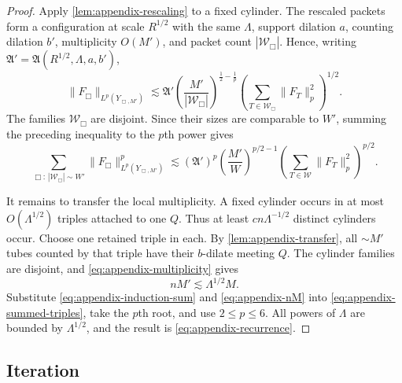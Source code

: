 \documentclass[11pt,letterpaper]{amsart}
\begin{document}
\begin{proof}
Apply \cref{lem:appendix-rescaling} to a fixed cylinder.  The rescaled
packets form a configuration at scale $R^{1/2}$ with the same $\Lambda$,
support dilation $a$, counting dilation $b'$, multiplicity $O(M')$, and
packet count $|\mathcal W_\Box|$.  Hence, writing
$\mathfrak A'=\mathfrak A(R^{1/2},\Lambda,a,b')$,
\[
 \|F_\Box\|_{L^p(Y_{\Box,M'})}
 \lesssim \mathfrak A'
 \left(\frac{M'}{|\mathcal W_\Box|}\right)^{\frac12-\frac1p}
 \left(\sum_{T\in\mathcal W_\Box}\|F_T\|_p^2\right)^{1/2}.
\]
The families $\mathcal W_\Box$ are disjoint.  Since their sizes are
comparable to $W'$, summing the preceding inequality to the $p$th power gives
\begin{equation}\label{eq:appendix-induction-sum}
 \sum_{\Box:\,|\mathcal W_\Box|\sim W'}
 \|F_\Box\|_{L^p(Y_{\Box,M'})}^p
 \lesssim
 (\mathfrak A')^p
 \left(\frac{M'}{W}\right)^{p/2-1}
 \left(\sum_{T\in\mathcal W}\|F_T\|_p^2\right)^{p/2}.
\end{equation}

It remains to transfer the local multiplicity.  A fixed cylinder occurs in
at most $O(\Lambda^{1/2})$ triples attached to one $Q$.  Thus at least
$cn\Lambda^{-1/2}$ distinct cylinders occur.  Choose one retained triple in
each.  By \cref{lem:appendix-transfer}, all $\sim M'$ tubes counted by that
triple have their $b$-dilate meeting $Q$.  The cylinder families are
disjoint, and \eqref{eq:appendix-multiplicity} gives
\begin{equation}\label{eq:appendix-nM}
 nM'\lesssim\Lambda^{1/2}M.
\end{equation}
Substitute \eqref{eq:appendix-induction-sum} and
\eqref{eq:appendix-nM} into \eqref{eq:appendix-summed-triples}, take the
$p$th root, and use $2\le p\le6$.  All powers of $\Lambda$ are bounded by
$\Lambda^{1/2}$, and the result is \eqref{eq:appendix-recurrence}.
\end{proof}

\subsection{Iteration}
\end{document}
